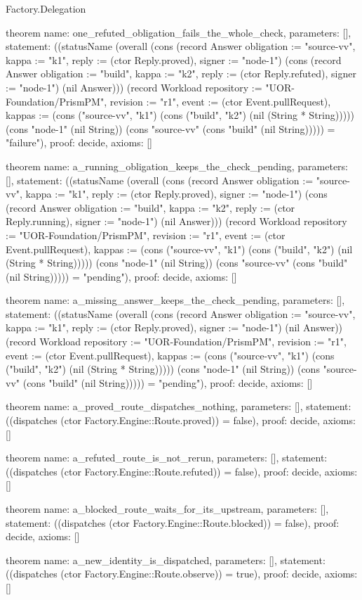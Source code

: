 \begin{lexlean}{Factory.Delegation}
\begin{semanticmodule}
theorem{
  name: one_refuted_obligation_fails_the_whole_check,
  parameters: [],
  statement: ((statusName (overall (cons (record Answer {obligation := "source-vv", kappa := "k1", reply := (ctor Reply.proved), signer := "node-1"}) (cons (record Answer {obligation := "build", kappa := "k2", reply := (ctor Reply.refuted), signer := "node-1"}) (nil Answer))) (record Workload {repository := "UOR-Foundation/PrismPM", revision := "r1", event := (ctor Event.pullRequest), kappas := (cons ("source-vv", "k1") (cons ("build", "k2") (nil (String * String))))}) (cons "node-1" (nil String)) (cons "source-vv" (cons "build" (nil String))))) = "failure"),
  proof: decide{},
  axioms: []
}

theorem{
  name: a_running_obligation_keeps_the_check_pending,
  parameters: [],
  statement: ((statusName (overall (cons (record Answer {obligation := "source-vv", kappa := "k1", reply := (ctor Reply.proved), signer := "node-1"}) (cons (record Answer {obligation := "build", kappa := "k2", reply := (ctor Reply.running), signer := "node-1"}) (nil Answer))) (record Workload {repository := "UOR-Foundation/PrismPM", revision := "r1", event := (ctor Event.pullRequest), kappas := (cons ("source-vv", "k1") (cons ("build", "k2") (nil (String * String))))}) (cons "node-1" (nil String)) (cons "source-vv" (cons "build" (nil String))))) = "pending"),
  proof: decide{},
  axioms: []
}

theorem{
  name: a_missing_answer_keeps_the_check_pending,
  parameters: [],
  statement: ((statusName (overall (cons (record Answer {obligation := "source-vv", kappa := "k1", reply := (ctor Reply.proved), signer := "node-1"}) (nil Answer)) (record Workload {repository := "UOR-Foundation/PrismPM", revision := "r1", event := (ctor Event.pullRequest), kappas := (cons ("source-vv", "k1") (cons ("build", "k2") (nil (String * String))))}) (cons "node-1" (nil String)) (cons "source-vv" (cons "build" (nil String))))) = "pending"),
  proof: decide{},
  axioms: []
}

theorem{
  name: a_proved_route_dispatches_nothing,
  parameters: [],
  statement: ((dispatches (ctor Factory.Engine::Route.proved)) = false),
  proof: decide{},
  axioms: []
}

theorem{
  name: a_refuted_route_is_not_rerun,
  parameters: [],
  statement: ((dispatches (ctor Factory.Engine::Route.refuted)) = false),
  proof: decide{},
  axioms: []
}

theorem{
  name: a_blocked_route_waits_for_its_upstream,
  parameters: [],
  statement: ((dispatches (ctor Factory.Engine::Route.blocked)) = false),
  proof: decide{},
  axioms: []
}

theorem{
  name: a_new_identity_is_dispatched,
  parameters: [],
  statement: ((dispatches (ctor Factory.Engine::Route.observe)) = true),
  proof: decide{},
  axioms: []
}
\end{semanticmodule}
\end{lexlean}
